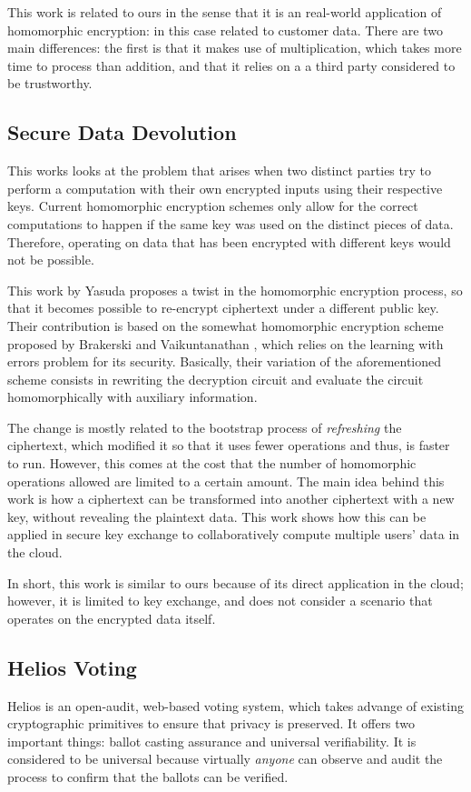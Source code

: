 This work is related to ours in the sense that it is an real-world application of homomorphic encryption: in this case related to customer data. There are two main differences: the first is that it makes use of multiplication, which takes more time to process than addition, and that it relies on a a third party considered to be trustworthy. 

\subsection{Secure Data Devolution}
This works looks at the problem that arises when two distinct parties try to perform a computation with their own encrypted inputs using their respective keys. Current homomorphic encryption schemes only allow for the correct computations to happen if the same key was used on the distinct pieces of data. Therefore, operating on data that has been encrypted with different keys would not be possible. 

This work by Yasuda \cite{Yasuda:2015:SDD:2732516.2732521} proposes a twist in the homomorphic encryption process, so that it becomes possible to re-encrypt ciphertext under a different public key. Their contribution is based on the somewhat homomorphic encryption scheme proposed by  Brakerski and Vaikuntanathan \cite{cryptoeprint:2011:277}, which relies on the learning with errors problem for its security.  Basically, their variation of the aforementioned scheme consists in rewriting the decryption circuit and evaluate the circuit homomorphically with auxiliary information.

The change is mostly related to the bootstrap process of \emph{refreshing} the ciphertext, which modified it so that it uses fewer operations and thus, is faster to run. However, this comes at the cost that the number of homomorphic operations allowed are limited to a certain amount. The main idea behind this work is how a ciphertext can be transformed into another ciphertext with a new key, without revealing the plaintext data. This work shows how this can be applied in secure key exchange to collaboratively compute multiple users' data in the cloud.

In short, this work is similar to ours because of its direct application in the cloud; however, it is limited to key exchange, and does not consider a scenario that operates on the encrypted data itself.

\subsection{{Helios Voting}}
Helios \cite{adida2008helios} is an open-audit, web-based voting system, which takes advange of existing cryptographic primitives to ensure that privacy is preserved. It offers two important things: ballot casting assurance and universal verifiability. It is considered to be universal because virtually \emph{anyone} can observe and audit the process to confirm that the ballots can be verified.

